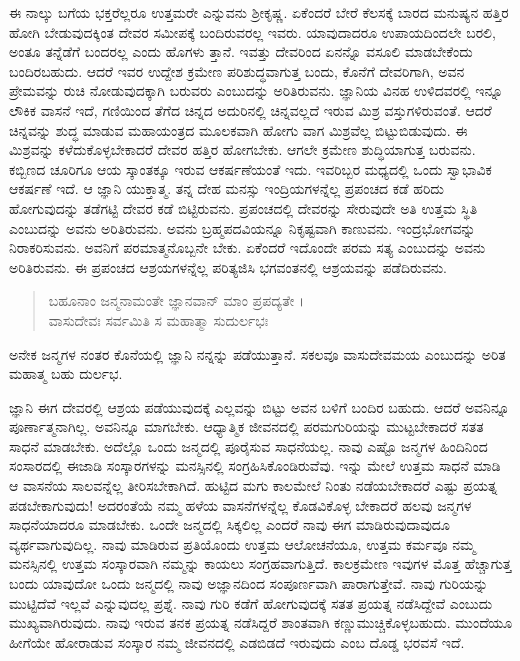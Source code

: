 ಈ ನಾಲ್ಕು ಬಗೆಯ ಭಕ್ತರೆಲ್ಲರೂ ಉತ್ತಮರೇ ಎನ್ನುವನು ಶ್ರೀಕೃಷ್ಣ. ಏಕೆಂದರೆ ಬೇರೆ ಕೆಲಸಕ್ಕೆ ಬಾರದ ಮನುಷ್ಯನ ಹತ್ತಿರ ಹೋಗಿ ಬೇಡುವುದಕ್ಕಿಂತ ದೇವರ ಸಮೀಪಕ್ಕೆ ಬಂದಿರುವರಲ್ಲ ಇವರು. ಯಾವುದಾದರೂ ಉಪಾಯದಿಂದಲೇ ಬರಲಿ, ಅಂತೂ ತನ್ನೆಡೆಗೆ ಬಂದರಲ್ಲ ಎಂದು ಹೊಗಳು ತ್ತಾನೆ. ಇವತ್ತು ದೇವರಿಂದ ಏನನ್ನೊ ವಸೂಲಿ ಮಾಡಬೇಕೆಂದು ಬಂದಿರಬಹುದು. ಆದರೆ ಇವರ ಉದ್ದೇಶ ಕ್ರಮೇಣ ಪರಿಶುದ್ಧವಾಗುತ್ತ ಬಂದು, ಕೊನೆಗೆ ದೇವರಿಗಾಗಿ, ಅವನ ಪ್ರೇಮವನ್ನು ರುಚಿ ನೋಡುವುದಕ್ಕಾಗಿ ಬರುವರು ಎಂಬುದನ್ನು ಅರಿತಿರುವನು. ಜ್ಞಾನಿಯ ವಿನಹ ಉಳಿದವರಲ್ಲಿ ಇನ್ನೂ ಲೌಕಿಕ ವಾಸನೆ ಇದೆ, ಗಣಿಯಿಂದ ತೆಗೆದ ಚಿನ್ನದ ಅದುರಿನಲ್ಲಿ ಚಿನ್ನವಲ್ಲದೆ ಇರುವ ಮಿಶ್ರ ವಸ್ತುಗಳಿರುವಂತೆ. ಆದರೆ ಚಿನ್ನವನ್ನು ಶುದ್ಧ ಮಾಡುವ ಮಹಾಯಂತ್ರದ ಮೂಲಕವಾಗಿ ಹೋಗು ವಾಗ ಮಿಶ್ರವೆಲ್ಲ ಬಿಟ್ಟುಬಿಡುವುದು. ಈ ಮಿಶ್ರವನ್ನು ಕಳೆದುಕೊಳ್ಳಬೇಕಾದರೆ ದೇವರ ಹತ್ತಿರ ಹೋಗಬೇಕು. ಆಗಲೇ ಕ್ರಮೇಣ ಶುದ್ಧಿಯಾಗುತ್ತ ಬರುವನು. ಕಬ್ಬಿಣದ ಚೂರಿಗೂ ಆಯ ಸ್ಕಾಂತಕ್ಕೂ ಇರುವ ಆಕರ್ಷಣೆಯಂತೆ ಇದು. ಇವರಿಬ್ಬರ ಮಧ್ಯದಲ್ಲಿ ಒಂದು ಸ್ವಾಭಾವಿಕ ಆಕರ್ಷಣೆ ಇದೆ. ಆ ಜ್ಞಾನಿ ಯುಕ್ತಾತ್ಮ. ತನ್ನ ದೇಹ ಮನಸ್ಸು ಇಂದ್ರಿಯಗಳನ್ನೆಲ್ಲ ಪ್ರಪಂಚದ ಕಡೆ ಹರಿದು ಹೋಗುವುದನ್ನು ತಡೆಗಟ್ಟಿ ದೇವರ ಕಡೆ ಬಿಟ್ಟಿರುವನು. ಪ್ರಪಂಚದಲ್ಲಿ ದೇವರನ್ನು ಸೇರುವುದೇ ಅತಿ ಉತ್ತಮ ಸ್ಥಿತಿ ಎಂಬುದನ್ನು ಅವನು ಅರಿತಿರುವನು. ಅವನು ಬ್ರಹ್ಮಪದವಿಯನ್ನೂ ನಿಕೃಷ್ಟವಾಗಿ ಕಾಣುವನು. ಇಂದ್ರಭೋಗವನ್ನು ನಿರಾಕರಿಸುವನು. ಅವನಿಗೆ ಪರಮಾತ್ಮನೊಬ್ಬನೇ ಬೇಕು. ಏಕೆಂದರೆ ಇದೊಂದೇ ಪರಮ ಸತ್ಯ ಎಂಬುದನ್ನು ಅವನು ಅರಿತಿರುವನು. ಈ ಪ್ರಪಂಚದ ಆಶ್ರಯಗಳನ್ನೆಲ್ಲ ಪರಿತ್ಯಜಿಸಿ ಭಗವಂತನಲ್ಲಿ ಆಶ್ರಯವನ್ನು ಪಡೆದಿರುವನು.

\begin{verse}
ಬಹೂನಾಂ ಜನ್ಮನಾಮಂತೇ ಜ್ಞಾನವಾನ್ ಮಾಂ ಪ್ರಪದ್ಯತೇ ।\\ವಾಸುದೇವಃ ಸರ್ವಮಿತಿ ಸ ಮಹಾತ್ಮಾ ಸುದುರ್ಲಭಃ 
\end{verse}

{\small ಅನೇಕ ಜನ್ಮಗಳ ನಂತರ ಕೊನೆಯಲ್ಲಿ ಜ್ಞಾನಿ ನನ್ನನ್ನು ಪಡೆಯುತ್ತಾನೆ. ಸಕಲವೂ ವಾಸುದೇವಮಯ ಎಂಬುದನ್ನು ಅರಿತ ಮಹಾತ್ಮ ಬಹು ದುರ್ಲಭ.}

ಜ್ಞಾನಿ ಈಗ ದೇವರಲ್ಲಿ ಆಶ್ರಯ ಪಡೆಯುವುದಕ್ಕೆ ಎಲ್ಲವನ್ನು ಬಿಟ್ಟು ಅವನ ಬಳಿಗೆ ಬಂದಿರ ಬಹುದು. ಆದರೆ ಅವನಿನ್ನೂ ಪೂರ್ಣಾತ್ಮನಾಗಿಲ್ಲ. ಅವನಿನ್ನೂ ಮಾಗಬೇಕು. ಆಧ್ಯಾತ್ಮಿಕ ಜೀವನದಲ್ಲಿ ಪರಮಗುರಿಯನ್ನು ಮುಟ್ಟಬೇಕಾದರೆ ಸತತ ಸಾಧನೆ ಮಾಡಬೇಕು. ಅದೆಲ್ಲೊ ಒಂದು ಜನ್ಮದಲ್ಲಿ ಪೂರೈಸುವ ಸಾಧನೆಯಲ್ಲ. ನಾವು ಎಷ್ಟೊ ಜನ್ಮಗಳ ಹಿಂದಿನಿಂದ ಸಂಸಾರದಲ್ಲಿ ಈಜಾಡಿ ಸಂಸ್ಕಾರಗಳನ್ನು ಮನಸ್ಸಿನಲ್ಲಿ ಸಂಗ್ರಹಿಸಿಕೊಂಡಿರುವೆವು. ಇನ್ನು ಮೇಲೆ ಉತ್ತಮ ಸಾಧನೆ ಮಾಡಿ ಆ ವಾಸನೆಯ ಸಾಲವನ್ನೆಲ್ಲ ತೀರಿಸಬೇಕಾಗಿದೆ. ಹುಟ್ಟಿದ ಮಗು ಕಾಲಮೇಲೆ ನಿಂತು ನಡೆಯಬೇಕಾದರೆ ಎಷ್ಟು ಪ್ರಯತ್ನ ಪಡಬೇಕಾಗುವುದು! ಅದರಂತೆಯೆ ನಮ್ಮ ಹಳೆಯ ವಾಸನೆಗಳನ್ನೆಲ್ಲ ಕೊಡವಿಕೊಳ್ಳ ಬೇಕಾದರೆ ಹಲವು ಜನ್ಮಗಳ ಸಾಧನೆಯಾದರೂ ಮಾಡಬೇಕು. ಒಂದೇ ಜನ್ಮದಲ್ಲಿ ಸಿಕ್ಕಲಿಲ್ಲ ಎಂದರೆ ನಾವು ಈಗ ಮಾಡಿರುವುದಾವುದೂ ವ್ಯರ್ಥವಾಗುವುದಿಲ್ಲ. ನಾವು ಮಾಡಿರುವ ಪ್ರತಿಯೊಂದು ಉತ್ತಮ ಆಲೋಚನೆಯೂ, ಉತ್ತಮ ಕರ್ಮವೂ ನಮ್ಮ ಮನಸ್ಸಿನಲ್ಲಿ ಉತ್ತಮ ಸಂಸ್ಕಾರವಾಗಿ ನಮ್ಮನ್ನು ಕಾಯಲು ಸಂಗ್ರಹವಾಗುತ್ತಿದೆ. ಕಾಲಕ್ರಮೇಣ ಇವುಗಳ ಮೊತ್ತ ಹೆಚ್ಚಾಗುತ್ತ ಬಂದು ಯಾವುದೋ ಒಂದು ಜನ್ಮದಲ್ಲಿ ನಾವು ಅಜ್ಞಾನದಿಂದ ಸಂಪೂರ್ಣವಾಗಿ ಪಾರಾಗುತ್ತೇವೆ. ನಾವು ಗುರಿಯನ್ನು ಮುಟ್ಟಿದೆವೆ ಇಲ್ಲವೆ ಎನ್ನುವುದಲ್ಲ ಪ್ರಶ್ನೆ. ನಾವು ಗುರಿ ಕಡೆಗೆ ಹೋಗುವುದಕ್ಕೆ ಸತತ ಪ್ರಯತ್ನ ನಡೆಸಿದ್ದೇವೆ ಎಂಬುದು ಮುಖ್ಯವಾಗಿರುವುದು. ನಾವು ಇರುವ ತನಕ ಪ್ರಯತ್ನ ನಡೆಸಿದ್ದರೆ ಶಾಂತವಾಗಿ ಕಣ್ಣುಮುಚ್ಚಿಕೊಳ್ಳಬಹುದು. ಮುಂದೆಯೂ ಹೀಗೆಯೇ ಹೋರಾಡುವ ಸಂಸ್ಕಾರ ನಮ್ಮ ಜೀವನದಲ್ಲಿ ಎಡಬಿಡದೆ ಇರುವುದು ಎಂಬ ದೊಡ್ಡ ಭರವಸೆ ಇದೆ.

